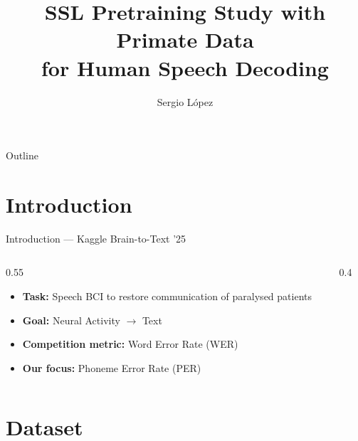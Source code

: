 \documentclass[aspectratio=169]{beamer}
\title{SSL Pretraining Study with Primate Data\\for Human Speech Decoding}
\author{Sergio López}
\date{}
\begin{document}
\begin{frame}
  \titlepage
\end{frame}

\begin{frame}{Outline}
  \tableofcontents
\end{frame}

\section{Introduction}

\begin{frame}{Introduction — Kaggle Brain-to-Text '25}
  \begin{columns}
    \begin{column}{0.55\textwidth}
      \begin{itemize}
        \item \textbf{Task:} Speech BCI to restore communication of paralysed patients
        \item \textbf{Goal:} Neural Activity $\rightarrow$ Text
        \item \textbf{Competition metric:} Word Error Rate (WER)
        \item \textbf{Our focus:} Phoneme Error Rate (PER)
      \end{itemize}
    \end{column}
    \begin{column}{0.4\textwidth}
      \begin{center}
      \end{center}
    \end{column}
  \end{columns}
\end{frame}

\section{Dataset}
\end{document}
